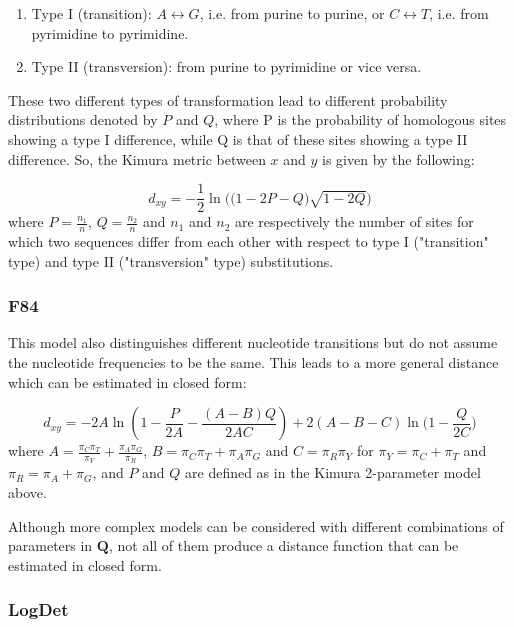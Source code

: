 \begin{enumerate}
    \item Type I (transition): $A\leftrightarrow G$, i.e. from purine to purine, or $C\leftrightarrow T$, i.e. from pyrimidine to pyrimidine.
    \item Type II (transversion): from purine to pyrimidine or vice versa.
\end{enumerate}

These two different types of transformation lead to different probability distributions denoted by $P$ and $Q$, where P is the probability of homologous sites showing a type I difference, while Q is that of these sites showing a type II difference. So, the Kimura \cite{K80} metric between $x$ and $y$ is given by the following:

\begin{equation}
d_{xy} = -\frac{1}{2}\ln\bigg( \big(1-2P-Q\big) \sqrt{1-2Q} \bigg)
\end{equation}
where $P=\frac{n_1}{n}$, $Q=\frac{n_2}{n}$ and $n_1$ and $n_2$ are respectively the number of sites for which two sequences differ from each other with respect to type I ("transition" type) and type II ("transversion" type) substitutions.

\subsubsection{F84}\label{F84_model}

This model \cite{F84} also distinguishes different nucleotide transitions but do not assume the nucleotide frequencies to be the same. This leads to a more general distance which can be estimated in closed form:

\begin{equation}
    d_{xy} = -2 A\ln\left( 1- \frac{P}{2A} - \frac{(A-B)Q}{2AC} \right) + 2(A-B-C)\ln\bigg( 1-\frac{Q}{2C} \bigg)
\label{eq:F84_distance}
\end{equation}
where $A = \frac{\pi_C \pi_T}{\pi_Y} + \frac{\pi_A \pi_G}{\pi_R}$, $B=\pi_C\pi_T + \pi_A\pi_G$ and $C=\pi_R\pi_Y$ for $\pi_Y = \pi_C + \pi_T$ and $\pi_R = \pi_A + \pi_G$, and $P$ and $Q$ are defined as in the Kimura 2-parameter model above.

Although more complex models can be considered with different combinations of parameters in $\mathbf{Q}$, not all of them produce a distance function that can be estimated in closed form. 

\subsubsection{LogDet}\label{LD_model}

